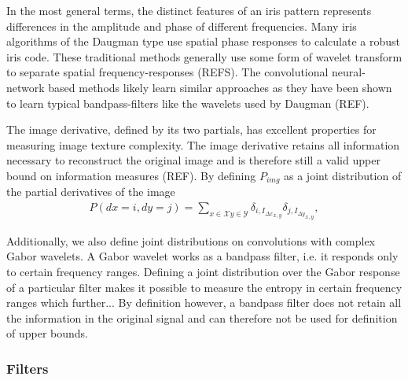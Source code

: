 In the most general terms, the distinct features of an iris pattern represents differences in the amplitude and phase of different frequencies. Many iris algorithms of the Daugman type use spatial phase responses to calculate a robust iris code. These traditional methods generally use some form of wavelet transform to separate spatial frequency-responses (REFS). The convolutional neural-network based methods likely learn similar approaches as they have been shown to learn typical bandpass-filters like the wavelets used by Daugman (REF). 

The image derivative, defined by its two partials, has excellent properties for measuring image texture complexity. The image derivative retains all information necessary to reconstruct the original image and is therefore still a valid upper bound on information measures (REF). By defining $P_{img}$ as a joint distribution of the partial derivatives of the image
\begin{align}
    P(dx=i, dy=j) = \sum_{x\in\mathcal{X}y\in\mathcal{Y}} \delta_{i, {I_{\Delta x}}_{x,y}} \delta_{j, {I_{\Delta y}}_{x,y}},
\end{align}

Additionally, we also define joint distributions on convolutions with complex Gabor wavelets. A Gabor wavelet works as a bandpass filter, i.e. it responds only to certain frequency ranges. Defining a joint distribution over the Gabor response of a particular filter makes it possible to measure the entropy in certain frequency ranges which further... By definition however, a bandpass filter does not retain all the information in the original signal and can therefore not be used for definition of upper bounds.




\subsubsection{Filters}

